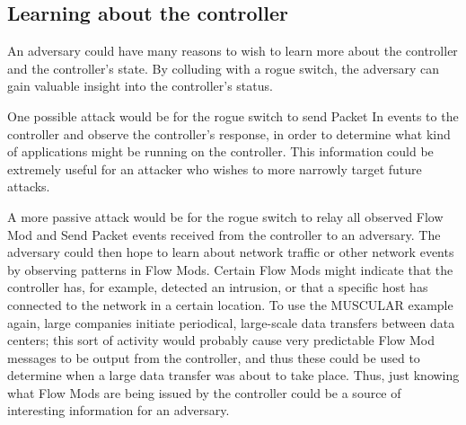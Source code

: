 \subsection{Learning about the controller}
An adversary could have many reasons to wish to learn more about the controller and the controller's state. By colluding with a rogue switch, the adversary can gain valuable insight into the controller's status.

One possible attack would be for the rogue switch to send Packet In events to the controller and observe the controller's response, in order to determine what kind of applications might be running on the controller. This information could be extremely useful for an attacker who wishes to more narrowly target future attacks.

A more passive attack would be for the rogue switch to relay all observed Flow Mod and Send Packet events received from the controller to an adversary. The adversary could then hope to learn about network traffic or other network events by observing patterns in Flow Mods. Certain Flow Mods might indicate that the controller has, for example, detected an intrusion, or that a specific host has connected to the network in a certain location. To use the MUSCULAR example again, large companies initiate periodical, large-scale data transfers between data centers; this sort of activity would probably cause very predictable Flow Mod messages to be output from the controller, and thus these could be used to determine when a large data transfer was about to take place. Thus, just knowing what Flow Mods are being issued by the controller could be a source of interesting information for an adversary.

